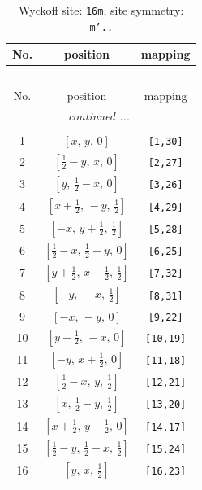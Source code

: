 \documentclass[fleqn,8pt]{jsarticle}
\begin{document}
\renewcommand{\arraystretch}{1.2}
\begin{longtable}{ccc}
\caption{Wyckoff site: {\tt 16m}, site symmetry: {\tt m'..}}
 \\
 \hline \hline
No. & position & mapping \\ \hline \endfirsthead

\multicolumn{2}{l}{\tablename\ \thetable{}} \\
 \hline \hline
No. & position & mapping \\ \hline \endhead

 \hline \hline
\multicolumn{2}{r}{\footnotesize\it continued ...} \\ \endfoot

 \hline \hline
\multicolumn{2}{r}{} \\ \endlastfoot

1 & $\left[ x,\, y,\, 0 \right]$ & {\tt [1,30]} \\ \hline
2 & $\left[ \frac{1}{2} - y,\, x,\, 0 \right]$ & {\tt [2,27]} \\ \hline
3 & $\left[ y,\, \frac{1}{2} - x,\, 0 \right]$ & {\tt [3,26]} \\ \hline
4 & $\left[ x + \frac{1}{2},\, - y,\, \frac{1}{2} \right]$ & {\tt [4,29]} \\ \hline
5 & $\left[ - x,\, y + \frac{1}{2},\, \frac{1}{2} \right]$ & {\tt [5,28]} \\ \hline
6 & $\left[ \frac{1}{2} - x,\, \frac{1}{2} - y,\, 0 \right]$ & {\tt [6,25]} \\ \hline
7 & $\left[ y + \frac{1}{2},\, x + \frac{1}{2},\, \frac{1}{2} \right]$ & {\tt [7,32]} \\ \hline
8 & $\left[ - y,\, - x,\, \frac{1}{2} \right]$ & {\tt [8,31]} \\ \hline
9 & $\left[ - x,\, - y,\, 0 \right]$ & {\tt [9,22]} \\ \hline
10 & $\left[ y + \frac{1}{2},\, - x,\, 0 \right]$ & {\tt [10,19]} \\ \hline
11 & $\left[ - y,\, x + \frac{1}{2},\, 0 \right]$ & {\tt [11,18]} \\ \hline
12 & $\left[ \frac{1}{2} - x,\, y,\, \frac{1}{2} \right]$ & {\tt [12,21]} \\ \hline
13 & $\left[ x,\, \frac{1}{2} - y,\, \frac{1}{2} \right]$ & {\tt [13,20]} \\ \hline
14 & $\left[ x + \frac{1}{2},\, y + \frac{1}{2},\, 0 \right]$ & {\tt [14,17]} \\ \hline
15 & $\left[ \frac{1}{2} - y,\, \frac{1}{2} - x,\, \frac{1}{2} \right]$ & {\tt [15,24]} \\ \hline
16 & $\left[ y,\, x,\, \frac{1}{2} \right]$ & {\tt [16,23]} \\
\end{longtable}
\end{document}
